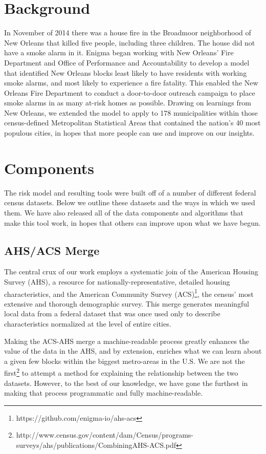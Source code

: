 \documentclass{sig-alternate}
\begin{document}
\section{Background}

In November of 2014 there was a house fire in the Broadmoor neighborhood of New Orleans that killed five people, including three children. The house did not have a smoke alarm in it. Enigma began working with New Orleans' Fire Department and Office of Performance and Accountability to develop a model that identified New Orleans blocks least likely to have residents with working smoke alarms, and most likely to experience a fire fatality. This enabled the New Orleans Fire Department to conduct a door-to-door outreach campaign to place smoke alarms in as many at-risk homes as possible. Drawing on learnings from New Orleans, we extended the model to apply to 178 municipalities within those census-defined Metropolitan Statistical Areas that contained the nation's 40 most populous cities, in hopes that more people can use and improve on our insights.


\section{Components}

The risk model and resulting tools were built off of a number of different federal census datasets. Below we outline these datasets and the ways in which we used them. We have also released all of the data components and algorithms that make this tool work, in hopes that others can improve upon what we have begun.

\subsection{AHS/ACS Merge}

The central crux of our work employs a systematic join of the American Housing Survey (AHS), a resource for nationally-representative, detailed housing characteristics, and the American Community Survey (ACS)\footnote{https://github.com/enigma-io/ahs-acs}, the census' most extensive and thorough demographic survey. This merge generates meaningful local data from a federal dataset that was once used only to describe characteristics normalized at the level of entire cities.

Making the ACS-AHS merge a machine-readable process greatly enhances the value of the data in the AHS, and by extension, enriches what we can learn about a given few blocks within the biggest metro-areas in the U.S. We are not the first\footnote{http://www.census.gov/content/dam/Census/programs-surveys/ahs/publications/CombiningAHS-ACS.pdf} to attempt a method for explaining the relationship between the two datasets. However, to the best of our knowledge, we have gone the furthest in making that process programmatic and fully machine-readable.
\end{document}
